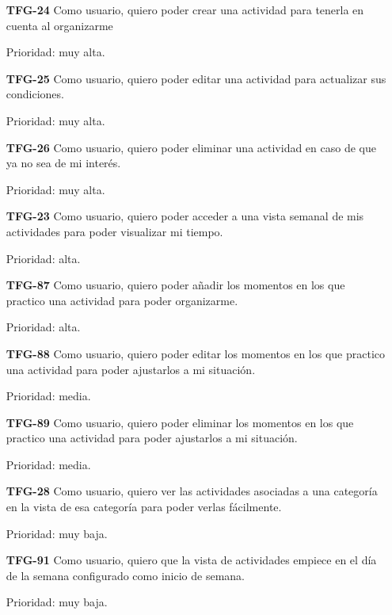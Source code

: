 \documentclass[10pt, a4paper]{aqademic}
\begin{document}
\begin{itemize}[leftmargin=16mm]
	\item [\textbf{TFG-24}] Como usuario, quiero poder crear una actividad para tenerla en cuenta al organizarme 
	
	Prioridad: muy alta.
	
	\item [\textbf{TFG-25}] Como usuario, quiero poder editar una actividad para actualizar sus condiciones.
	
	Prioridad: muy alta.
	
	\item [\textbf{TFG-26}] Como usuario, quiero poder eliminar una actividad en caso de que ya no sea de mi interés.
	
	Prioridad: muy alta.
	
	\item [\textbf{TFG-23}] Como usuario, quiero poder acceder a una vista semanal de mis actividades para poder visualizar mi tiempo.
	
	Prioridad: alta.
	
	\item [\textbf{TFG-87}] Como usuario, quiero poder añadir los momentos en los que practico una actividad para poder organizarme.
	
	Prioridad: alta.
	
	\item [\textbf{TFG-88}] Como usuario, quiero poder editar los momentos en los que practico una actividad para poder ajustarlos a mi situación.
	
	Prioridad: media.
	
	\item [\textbf{TFG-89}] Como usuario, quiero poder eliminar los momentos en los que practico una actividad para poder ajustarlos a mi situación.
	
	Prioridad: media.
	
	\item [\textbf{TFG-28}] Como usuario, quiero ver las actividades asociadas a una categoría en la vista de esa categoría para poder verlas fácilmente.
	
	Prioridad: muy baja.
	
	\item [\textbf{TFG-91}] Como usuario, quiero que la vista de actividades empiece en el día de la semana configurado como inicio de semana.
	
	Prioridad: muy baja.
\end{itemize}
\end{document}
